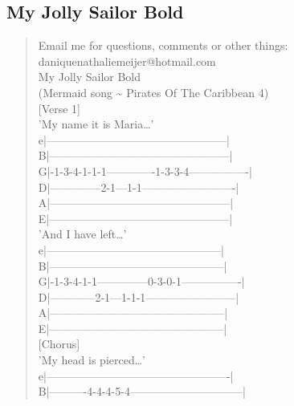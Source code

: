\documentclass[11pt]{article}
\begin{document}
\subsection{My Jolly Sailor Bold}
\label{sec:org98030d3}
\begin{verse}
Email me for questions, comments or other things:\\
daniquenathaliemeijer@hotmail.com\\
\vspace*{1em}
My Jolly Sailor Bold\\
(Mermaid song \textasciitilde{} Pirates Of The Caribbean 4)\\
\vspace*{1em}
\vspace*{1em}
[Verse 1]\\
\vspace*{1em}
'My name it is Maria\ldots{}'\\
e|------------------------------------------------|\\
B|------------------------------------------------|\\
G|-1-3-4-1-1-1-------------1-3-3-4----------------|\\
D|--------------2-1---1-1-------------------------|\\
A|------------------------------------------------|\\
E|------------------------------------------------|\\
\vspace*{1em}
'And I have left\ldots{}'\\
e|-----------------------------------------------|\\
B|-----------------------------------------------|\\
G|-1-3-4-1-1--------------0-3-0-1----------------|\\
D|------------2-1---1-1-1------------------------|\\
A|-----------------------------------------------|\\
E|-----------------------------------------------|\\
\vspace*{1em}
\vspace*{1em}
[Chorus]\\
\vspace*{1em}
'My head is pierced\ldots{}'\\
e|-------------------------------------------------|\\
B|----------4-4-4-5-4------------------------------|\\

\end{verse}
\end{document}
